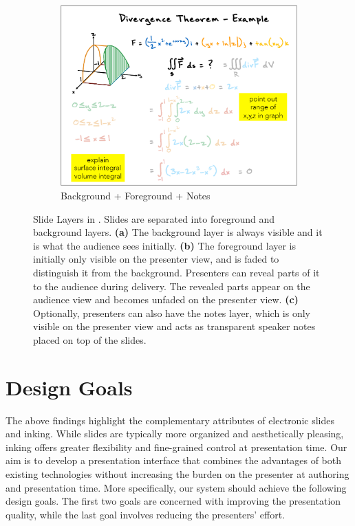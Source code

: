 \begin{figure}[t!]
\begin{subfigure}[t]{0.32\textwidth}
        \centering
        \includegraphics[width=1\columnwidth]{figures/videoslide3}
        \caption{Background + Foreground + Notes}
    \end{subfigure}
    \caption{Slide Layers in \interface. Slides are separated into foreground and background layers. \textbf{(a)} The background layer is always visible and it is what the audience sees initially. \textbf{(b)} The foreground layer is initially only visible on the presenter view, and is faded to distinguish it from the background. Presenters can reveal parts of it to the audience during delivery. The revealed parts appear on the audience view and becomes unfaded on the presenter view. \textbf{(c)} Optionally, presenters can also have the notes layer, which is only visible on the presenter view and acts as transparent speaker notes placed on top of the slides. }
    \label{fig:slidelayers}
\end{figure}
\section{Design Goals}

The above findings highlight the complementary attributes of electronic slides and inking. While slides are typically more organized and aesthetically pleasing, inking offers greater flexibility and fine-grained control at presentation time.
%
Our aim is to develop a presentation interface that combines the advantages of both existing technologies without increasing the burden on the presenter at authoring and presentation time.
%
More specifically, our system should achieve the following design goals. The first two goals are concerned with improving the presentation quality, while the last goal involves reducing the presenters' effort. 

